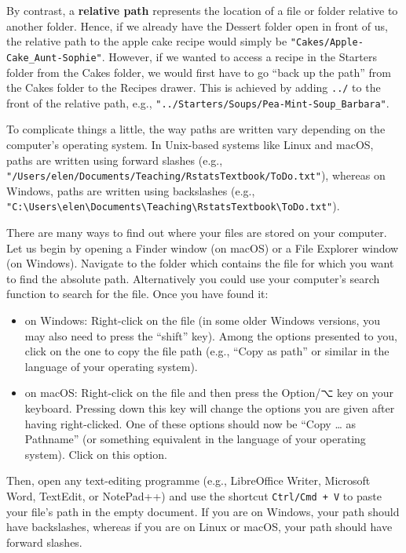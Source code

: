 \documentclass[
  letterpaper,
  DIV=11,
  numbers=noendperiod]{scrreprt}
\begin{document}
By contrast, a \textbf{relative path} represents the location of a file
or folder relative to another folder. Hence, if we already have the
Dessert folder open in front of us, the relative path to the apple cake
recipe would simply be \texttt{"Cakes/Apple-Cake\_Aunt-Sophie"}.
However, if we wanted to access a recipe in the Starters folder from the
Cakes folder, we would first have to go ``back up the path'' from the
Cakes folder to the Recipes drawer. This is achieved by adding
\texttt{../} to the front of the relative path, e.g.,
\texttt{"../Starters/Soups/Pea-Mint-Soup\_Barbara"}.

To complicate things a little, the way paths are written vary depending
on the computer's operating system. In Unix-based systems like Linux and
macOS, paths are written using forward slashes (e.g.,
\texttt{"/Users/elen/Documents/Teaching/RstatsTextbook/ToDo.txt"}),
whereas on Windows, paths are written using backslashes (e.g.,
\texttt{"C:\textbackslash{}Users\textbackslash{}elen\textbackslash{}Documents\textbackslash{}Teaching\textbackslash{}RstatsTextbook\textbackslash{}ToDo.txt"}).

There are many ways to find out where your files are stored on your
computer. Let us begin by opening a Finder window (on macOS) or a File
Explorer window (on Windows). Navigate to the folder which contains the
file for which you want to find the absolute path. Alternatively you
could use your computer's search function to search for the file. Once
you have found it:

\begin{itemize}
\item
  on Windows: Right-click on the file (in some older Windows versions,
  you may also need to press the ``shift'' key). Among the options
  presented to you, click on the one to copy the file path (e.g., ``Copy
  as path'' or similar in the language of your operating system).
\item
  on macOS: Right-click on the file and then press the Option/⌥ key on
  your keyboard. Pressing down this key will change the options you are
  given after having right-clicked. One of these options should now be
  ``Copy \ldots{} as Pathname'' (or something equivalent in the language
  of your operating system). Click on this option.
\end{itemize}

Then, open any text-editing programme (e.g., LibreOffice Writer,
Microsoft Word, TextEdit, or NotePad++) and use the shortcut
\texttt{Ctrl/Cmd\ +\ V} to paste your file's path in the empty document.
If you are on Windows, your path should have backslashes, whereas if you
are on Linux or macOS, your path should have forward slashes.
\end{document}

